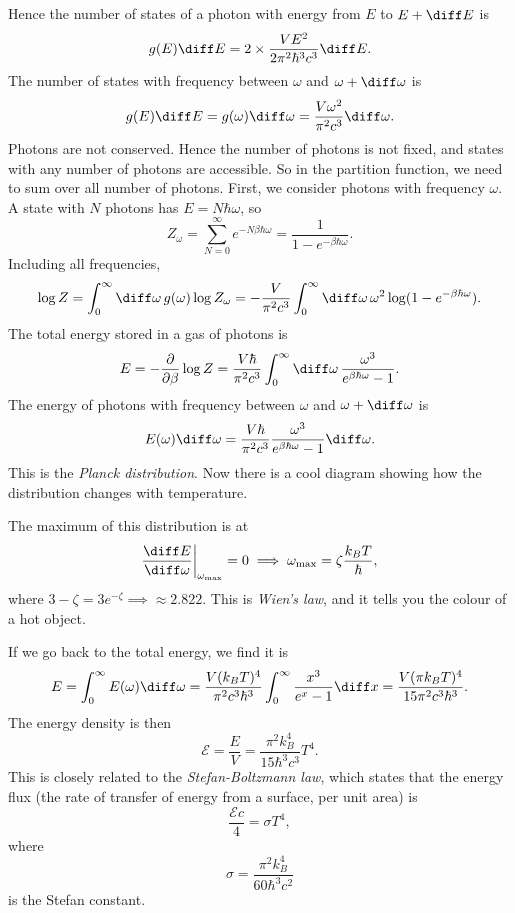 \documentclass[12pt]{article}
\begin{document}
Hence the number of states of a photon with energy from $E$ to $E + \diff E$ is
\[
g(E) \diff E = 2 \times \frac{V E^2}{2 \pi^2 \hbar^3 c^3} \diff E.
\]
The number of states with frequency between $\omega$ and $\omega + \diff \omega$ is
\[
g(E) \diff E = g(\omega) \diff \omega = \frac{V\omega^2}{\pi^2 c^3}\diff \omega.
\]
Photons are not conserved. Hence the number of photons is not fixed, and states with any number of photons are accessible. So in the partition function, we need to sum over all number of photons. First, we consider photons with frequency $\omega$. A state with $N$ photons has $E = N \hbar \omega$, so
\[
Z_\omega = \sum_{N = 0}^\infty e^{-N \beta \hbar \omega} = \frac{1}{1 - e^{-\beta \hbar \omega}}.
\]
Including all frequencies,
\[
\log Z = \int_0^\infty \diff \omega \, g(\omega) \log Z_\omega = - \frac{V}{\pi^2 c^3} \int_0^\infty \diff \omega\, \omega^2 \log(1 - e^{-\beta \hbar \omega}).
\]
The total energy stored in a gas of photons is
\[
E = - \frac{\partial}{\partial \beta} \log Z = \frac{V \hbar}{\pi^2 c^3} \int_0^\infty \diff \omega \, \frac{\omega^3}{e^{\beta \hbar \omega} - 1}.
\]
The energy of photons with frequency between $\omega$ and $\omega + \diff \omega$ is
\[
E(\omega) \diff \omega = \frac{V \hbar}{\pi^2 c^3} \frac{\omega^3}{e^{\beta \hbar \omega} - 1} \diff \omega.
\]
This is the \emph{Planck distribution}. Now there is a cool diagram showing how the distribution changes with temperature.

The maximum of this distribution is at
\[
\frac{\diff E}{\diff \omega} \biggr|_{\omega_{\mathrm{max}}} = 0 \implies \omega_{\mathrm{max}} = \zeta \frac{k_B T}{\hbar},
\]
where $3 - \zeta = 3 e^{-\zeta} \implies \approx 2.822$. This is \emph{Wien's law}, and it tells you the colour of a hot object.

If we go back to the total energy, we find it is
\[
E = \int_0^\infty E(\omega) \diff \omega = \frac{V(k_B T)^4}{\pi^2 c^3 \hbar^3} \int_0^\infty \frac{x^3}{e^x - 1} \diff x = \frac{V (\pi k_B T)^4}{15 \pi^2 c^3 \hbar^3}.
\]
The energy density is then
\[
\mathcal{E} = \frac{E}{V} = \frac{\pi^2 k_B^4}{15 \hbar^3 c^3} T^4.
\]
This is closely related to the \emph{Stefan-Boltzmann law}, which states that the energy flux (the rate of transfer of energy from a surface, per unit area) is
\[
\frac{\mathcal{E} c}{4} = \sigma T^4,
\]
where
\[
\sigma = \frac{\pi^2 k_B^4}{60 \hbar^3 c^2}
\]
is the Stefan constant.
\end{document}

